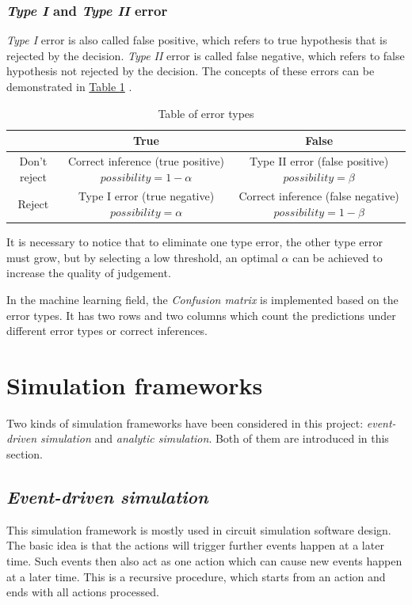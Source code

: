 \documentclass[12pt,a4paper]{report}
\begin{document}
        \subsubsection{\emph{Type I} and \emph{Type II} error}
        \emph{Type I} error is also called false positive, which refers to true hypothesis that is rejected by the decision. \emph{Type II} error is called false negative, which refers to false hypothesis not rejected by the decision. The concepts of these errors can be demonstrated in \hyperref[table_error_types]{Table \ref*{table_error_types}} \cite{website:typeItypeIIerror}.
        \begin{table}[ht]
            \centering
            \begin{tabulary}{\linewidth}{|C |C| C|}
                \hline
                 & True & False \\
                \hline
                Don't reject & Correct inference (true positive) $possibility = 1-\alpha$ & Type II error (false positive) $possibility = \beta$ \\
                \hline
                Reject & Type I error (true negative) $possibility = \alpha$ & Correct inference (false negative) $possibility = 1-\beta$ \\
                \hline
            \end{tabulary}
            \caption{Table of error types}
            \label{table_error_types}
        \end{table}
        
        It is necessary to notice that to eliminate one type error, the other type error must grow, but by selecting a low threshold, an optimal $\alpha$ can be achieved to increase the quality of judgement.

        In the machine learning field, the \emph{Confusion matrix} is implemented based on the error types. It has two rows and two columns which count the predictions under different error types or correct inferences.
        \section{Simulation frameworks}
        Two kinds of simulation frameworks have been considered in this project: \emph{event-driven simulation} and \emph{analytic simulation}.
        Both of them are introduced in this section.

        \subsection{\emph{Event-driven simulation}}
        This simulation framework is mostly used in circuit simulation software design. The basic idea is that the actions will trigger further events happen at a later time. Such events then also act as one action which can cause new events happen at a later time.
        This is a recursive procedure, which starts from an action and ends with all actions processed.
\end{document}
